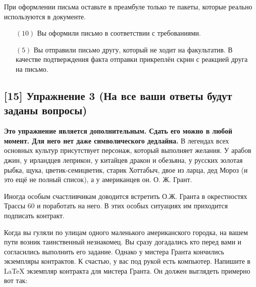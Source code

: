 \documentclass[12pt, a4paper, oneside]{article}
\begin{document}
При оформлении письма оставьте в преамбуле только те пакеты, которые реально используются в документе.

\begin{itemize}
\item[$(10)$] Вы оформили письмо в соответствии с требованиями.

\item[$(5)$] Вы отправили письмо другу, который не ходит на факультатив. В качестве подтверждения факта отправки прикреплён скрин с реакцией друга на письмо.
\end{itemize}

\subsection*{[15]  Упражнение 3 (На все ваши ответы будут заданы вопросы)}

\textbf{Это упражнение  является дополнительным. Сдать его можно в любой момент. Для него нет даже символического дедлайна.}  В легендах всех основных культур присутствует персонаж, который выполняет желания. У арабов джин, у ирландцев леприкон, у китайцев дракон и обезьяна, у русских золотая рыбка, щука, цветик-семицветик, старик Хоттабыч, двое из ларца, дед Мороз (и это ещё не полный список), а у американцев он. О. Ж. Грант.

Иногда особым счастливчикам доводится встретить О.Ж. Гранта в окрестностях Трассы 60 и поработать на него. В этих особых ситуациях им приходится подписать контракт.

Когда вы гуляли по улицам одного маленького американского городка, на вашем пути возник таинственный незнакомец. Вы сразу догадались кто перед вами и согласились выполнить его задание. Однако у мистера Гранта кончились экземпляры контрактов. К счастью, у вас под рукой есть компьютер. Напишите в \LaTeX{} экземпляр контракта для мистера Гранта. Он должен выглядеть примерно вот так:
\end{document}
